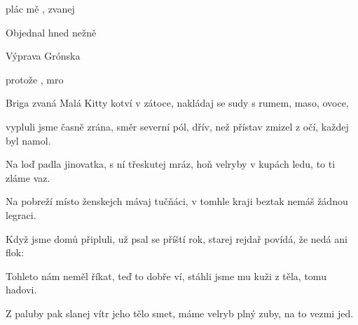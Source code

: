 

\zs
{} plác mě  , zvanej 


Objednal hned   nežně 

\ks

\zr
Výprava   Grónska  

protože  ,  mro
\kr

\zs
Briga zvaná Malá Kitty kotví v zátoce,
nakládaj se sudy s rumem, maso, ovoce,

vypluli jsme časně zrána, směr severní pól,
dřív, než přístav zmizel z očí, každej byl namol.
\ks

\zr  \kr

\zs
Na loď padla jinovatka, s ní třeskutej mráz,
hoň velryby v kupách ledu, to ti zláme vaz.

Na pobreží místo ženskejch mávaj tučňáci,
v tomhle kraji beztak nemáš žádnou legraci.
\ks

\zr  \kr

\zs
Když jsme domů připluli, už psal se příští rok,
starej rejdař povídá, že nedá ani flok:

\ks

\zr  \kr

\zs
Tohleto nám neměl říkat, teď to dobře ví,
stáhli jsme mu kuži z těla, tomu hadovi.

Z paluby pak slanej vítr jeho tělo smet,
máme velryb plný zuby, na to vezmi jed.
\ks

\zr  \kr

\kp
